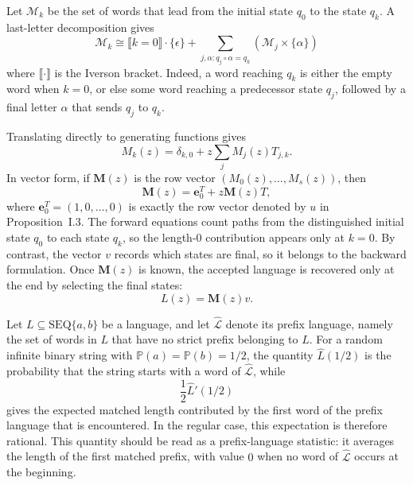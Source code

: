 
Let $\mathcal{M}_{k}$ be the set of words that lead from the initial state $q_{0}$ to the state
$q_{k}$. A last-letter decomposition gives
\begin{equation*}
    \mathcal{M}_{k} \cong \llbracket k = 0 \rrbracket \cdot \{\epsilon\} +
        \sum_{j, \alpha: q_{j} \circ \alpha = q_{k}} (\mathcal{M}_{j} \times \{\alpha\})
\end{equation*}
where $\llbracket \cdot \rrbracket$ is the Iverson bracket. Indeed, a word reaching $q_{k}$ is either
the empty word when $k = 0$, or else some word reaching a predecessor state $q_{j}$,
followed by a final letter $\alpha$ that sends $q_{j}$ to $q_{k}$.

Translating directly to generating functions gives
\begin{equation*}
    M_{k}(z) = \delta_{k, 0} + z \sum_{j} M_{j}(z) T_{j, k}.
\end{equation*}
In vector form, if $\mathbf{M}(z)$ is the row vector $(M_{0}(z), \dots, M_{s}(z))$, then
\begin{equation*}
    \mathbf{M}(z) = \mathbf{e}_{0}^{T} + z\mathbf{M}(z)T,
\end{equation*}
where $\mathbf{e}_{0}^{T} = (1, 0, \dots, 0)$ is exactly the row vector denoted by $u$ in
Proposition~I.3. The forward equations count paths from the distinguished initial state
$q_{0}$ to each state $q_{k}$, so the length-$0$ contribution appears only at $k = 0$.
By contrast, the vector $v$ records which states are final, so it belongs to the backward
formulation. Once $\mathbf{M}(z)$ is known, the accepted language is recovered only at the end by
selecting the final states:
\begin{equation*}
    L(z) = \mathbf{M}(z)v.
\end{equation*}

Let $L \subseteq \mathrm{SEQ}\{a, b\}$ be a language, and let $\hat{\mathcal{L}}$ denote its
prefix language, namely the set of words in $L$ that have no strict prefix belonging to $L$.
For a random infinite binary string with $\mathbb{P}(a) = \mathbb{P}(b) = 1/2$, the quantity
$\hat{L}(1/2)$ is the probability that the string starts with a word of $\hat{\mathcal{L}}$,
while
\begin{equation*}
    \frac{1}{2} \hat{L}'(1/2)
\end{equation*}
gives the expected matched length contributed by the first word of the prefix language that
is encountered. In the regular case, this expectation is therefore rational.
This quantity should be read as a prefix-language statistic: it averages the length of the first
matched prefix, with value $0$ when no word of $\hat{\mathcal{L}}$ occurs at the beginning.


